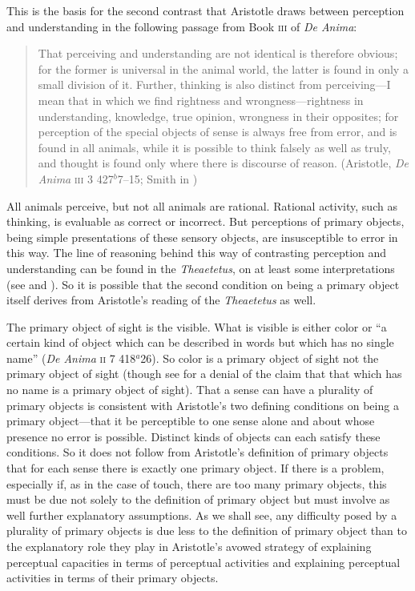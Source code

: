 This is the basis for the second contrast that Aristotle draws between perception and understanding in the following passage from Book \textsc{iii} of \emph{De Anima}:
\begin{quote}
	That perceiving and understanding are not identical is therefore obvious; for the former is universal in the animal world, the latter is found in only a small division of it. Further, thinking is also distinct from perceiving---I mean that in which we find rightness and wrongness---right\-ness in understanding, knowledge, true opinion, wrongness in their opposites; for perception of the special objects of sense is always free from error, and is found in all animals, while it is possible to think falsely as well as truly, and thought is found only where there is discourse of reason. (Aristotle, \emph{De Anima} \textsc{iii} 3 427\( ^{b} \)7--15; Smith in \citealt[49]{Barnes:1984uq})
\end{quote}
All animals perceive, but not all animals are rational. Rational activity, such as thinking, is evaluable as correct or incorrect. But perceptions of primary objects, being simple presentations of these sensory objects, are insusceptible to error in this way. The line of reasoning behind this way of contrasting perception and understanding can be found in the \emph{Theaetetus}, on at least some interpretations (see \citealt{Cooper:1970kx} and \citealt{Burnyeat:1990dp}). So it is possible that the second condition on being a primary object itself derives from Aristotle's reading of the \emph{Theaetetus} as well.

The primary object of sight is the visible. What is visible is either color or ``a certain kind of object which can be described in words but which has no single name'' (\emph{De Anima} \textsc{ii} 7 418\( ^{a} \)26). So color is a primary object of sight not the primary object of sight (though see \citealt[252]{Polansky:2007ly} for a denial of the claim that that which has no name is a primary object of sight). That a sense can have a plurality of primary objects is consistent with Aristotle's two defining conditions on being a primary object---that it be perceptible to one sense alone and about whose presence no error is possible. Distinct kinds of objects can each satisfy these conditions. So it does not follow from Aristotle's definition of primary objects that for each sense there is exactly one primary object. If there is a problem, especially if, as in the case of touch, there are too many primary objects, this must be due not solely to the definition of primary object but must involve as well further explanatory assumptions. As we shall see, any difficulty posed by a plurality of primary objects is due less to the definition of primary object than to the explanatory role they play in Aristotle's avowed strategy of explaining perceptual capacities in terms of perceptual activities and explaining perceptual activities in terms of their primary objects.

